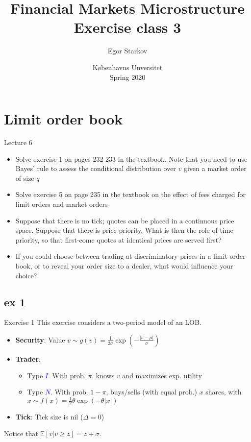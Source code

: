 \documentclass[english,10pt]{beamer}
\title{Financial Markets Microstructure \\ Exercise class 3}
\author{Egor Starkov}
\date{K{\o}benhavns Unversitet \\
	Spring 2020}
\begin{document}
\frame[plain]{\titlepage}
\addtocounter{framenumber}{-1}



\section{Limit order book}

\begin{frame}{Lecture 6}
	\begin{itemize}
		\item Solve exercise 1 on pages 232-233 in the textbook. Note that you need to use Bayes' rule to assess the conditional distribution over $v$ given a market order of size $q$
		\item Solve exercise 5 on page 235 in the textbook on the effect of fees charged for limit orders and market orders
		\item Suppose that there is no tick; quotes can be placed in a continuous price space. Suppose that there is price priority. What is then the role of time priority, so that first-come quotes at identical prices are served first?
		\item If you could choose between trading at discriminatory prices in a limit order book, or to reveal your order size to a dealer, what would influence your choice?
	\end{itemize}
\end{frame}




\subsection{ex 1}

\begin{frame}[label=ex1]{Exercise 1}
	This exercise considers a two-period model of an LOB.
	\begin{itemize}
		\item \textbf{Security}: Value $v \sim g(v)=\frac{1}{2\sigma} \exp \left(-\frac{|v-\mu|}{\sigma}\right)$
		\item \textbf{Trader}: 
		\begin{itemize}
			\item Type \textcolor{blue}{$I$}. With prob. $\pi$, knows $v$ and maximizes exp. utility
			\item Type \textcolor{blue}{$N$}. With prob. $1-\pi$, buys/sells (with equal prob.) $x$ shares, with $x \sim f(x)=\frac{1}{2}\theta \exp(-\theta |x|)$ 
		\end{itemize}
		\item \textbf{Tick}: Tick size is nil ($\Delta=0$)
	\end{itemize}
	Notice that $\mathbb{E}[v|v \ge z]=z+\sigma$.
\end{frame}
\end{document}
